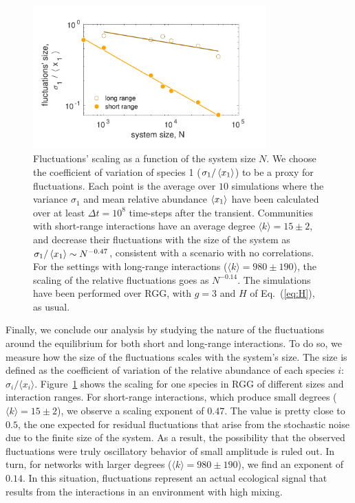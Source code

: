 \begin{figure}[t!]
 \centering
 \includegraphics[width=0.8\textwidth]{figures/chp1/fig8.pdf}
  \caption[Interplay between fluctuations' scaling and system size]{Fluctuations' scaling as a function of the system size $N$. We choose the coefficient of variation of species 1 ($\sigma_1/\left\langle x_1\right\rangle$) to be a proxy for fluctuations. Each point is the average over $10$  simulations where the variance $\sigma_1$ and mean relative abundance $\left\langle x_1\right\rangle$ have been calculated over at least $\Delta t = 10^8$ time-steps after the transient. Communities with short-range interactions have an average degree $\langle k \rangle = 15 \pm 2$, and decrease their fluctuations with the size of the system as $\sigma_1/\left\langle x_1\right\rangle\sim N^{-0.47}$, consistent with a scenario with no correlations. For the settings with long-range interactions ($\langle k \rangle = 980 \pm 190$), the scaling of the relative fluctuations goes as $N^{-0.14}$. The simulations have been performed over RGG, with $g =3$ and $H$ of Eq.~(\ref{eq:H}), as usual.}
    \label{chp1:fig:8}
\end{figure}

Finally, we conclude our analysis by studying the nature of the fluctuations around the equilibrium for both short and long-range interactions. To do so, we measure how the size of the fluctuations scales with the system's size. The size is defined as the coefficient of variation of the relative abundance of each species $i$: $\sigma_i/\langle x_i \rangle$. Figure~\ref{chp1:fig:8} shows the scaling for one species in RGG of different sizes and interaction ranges. For short-range interactions, which produce small degrees ($\langle k \rangle = 15 \pm 2$), we observe a scaling exponent of $0.47$. The value is pretty close to $0.5$, the one expected for residual fluctuations that arise from the stochastic noise due to the finite size of the system. As a result, the possibility that the observed fluctuations were truly oscillatory behavior of small amplitude is ruled out. In turn, for networks with larger degrees ($\langle k \rangle = 980 \pm 190$), we find an exponent of $0.14$. In this situation, fluctuations represent an actual ecological signal that results from the interactions in an environment with high mixing. \\

